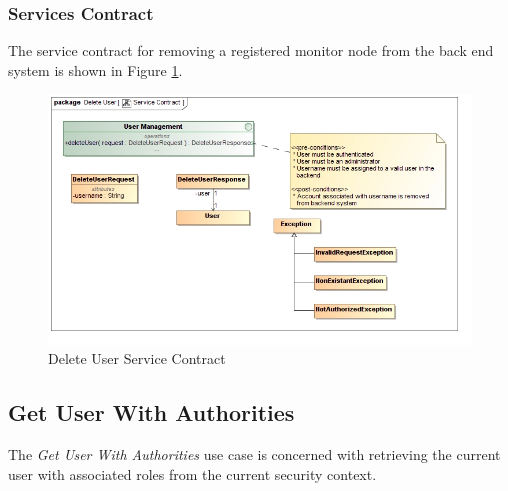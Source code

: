 \subsubsection{Services Contract}
The service contract for removing a registered monitor node from the back end 
system is shown in Figure \ref{fig:deleteUserServicesContract}.
\begin{figure}[H]
	\begin{center}
		\includegraphics[scale=0.4]{../Diagrams and Charts/User Management/Delete User Service Contract.jpg}
		\caption{Delete User Service Contract}
		\label{fig:deleteUserServicesContract}
	\end{center}
\end{figure}



\subsection{Get User With Authorities}
The \textit{Get User With Authorities} use case is concerned with retrieving the
current user with associated roles from the current security context.

